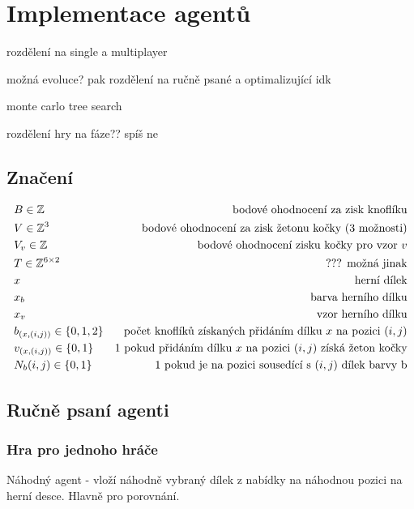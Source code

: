 \chapter{Implementace agentů}

rozdělení na single a multiplayer

možná evoluce? pak rozdělení na ručně psané a optimalizující idk

monte carlo tree search

rozdělení hry na fáze?? spíš ne

\section{Značení}
\begin{align*}
    &B \in \Bbb{Z} &\text{bodové ohodnocení za zisk knoflíku}\\
    &V \in \Bbb{Z}^3 &\text{bodové ohodnocení za zisk žetonu kočky (3 možnosti)}\\
    &V_v \in \Bbb{Z} &\text{bodové ohodnocení zisku kočky pro vzor } v\\
    &T \in \Bbb{Z}^{6\times2} &\text{??? možná jinak}\\
    &x &\text{herní dílek}\\
    &x_b &\text{barva herního dílku}\\
    &x_v &\text{vzor herního dílku}\\
    &b_{(x,(i,j))} \in \{0,1,2\} &\text{počet knoflíků získaných přidáním dílku $x$ na pozici $(i,j)$}\\
    &v_{(x,(i,j))} \in \{0,1\} &\text{$1$ pokud přidáním dílku $x$ na pozici $(i,j)$ získá žeton kočky}\\
    &N_b(i,j) \in \{0,1\} &\text{$1$ pokud je na pozici sousedící s $(i,j)$ dílek barvy b}\\
\end{align*}

\section{Ručně psaní agenti}
\subsection{Hra pro jednoho hráče}

Náhodný agent - vloží náhodně vybraný dílek z nabídky na náhodnou pozici na herní desce. Hlavně pro porovnání.

\vspace{10pt}

